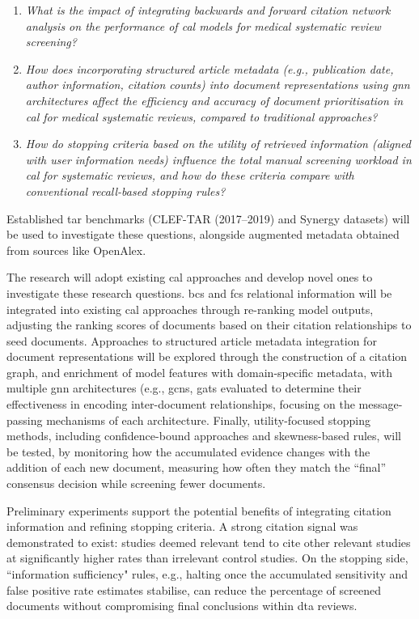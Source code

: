\documentclass[10pt,oneside]{book}
\begin{document}
\begin{enumerate}
    \item \emph{What is the impact of integrating backwards and forward citation network analysis on the performance of \gls*{cal} models for medical systematic review screening?} 
    \item \emph{How does incorporating structured article metadata (e.g., publication date, author information, citation counts) into document representations using \gls*{gnn} architectures affect the efficiency and accuracy of document prioritisation in \gls*{cal} for medical systematic reviews, compared to traditional approaches?} 
    \item \emph{How do stopping criteria based on the utility of retrieved information (aligned with user information needs) influence the total manual screening workload in \gls*{cal} for systematic reviews, and how do these criteria compare with conventional recall-based stopping rules?}
\end{enumerate}
Established \gls*{tar} benchmarks (CLEF-TAR (2017–2019) and Synergy datasets) will be used to investigate these questions, alongside augmented metadata obtained from sources like OpenAlex.


The research will adopt existing \gls*{cal} approaches and develop novel ones to investigate these research questions. \gls*{bcs} and \gls*{fcs} relational information will be integrated into existing \gls*{cal} approaches through re-ranking model outputs, adjusting the ranking scores of documents based on their citation relationships to seed documents. Approaches to structured article metadata integration for document representations will be explored through the construction of a citation graph, and enrichment of model features with domain-specific metadata, with multiple \gls*{gnn} architectures (e.g., \glspl*{gcn}, \glspl*{gat}  evaluated to determine their effectiveness in encoding inter-document relationships, focusing on the message-passing mechanisms of each architecture. Finally, utility-focused stopping methods, including confidence-bound approaches and skewness-based rules, will be tested, by monitoring how the accumulated evidence changes with the addition of each new document, measuring how often they match the “final” consensus decision while screening fewer documents. 

Preliminary experiments support the potential benefits of integrating citation information and refining stopping criteria. A strong citation signal was demonstrated to exist: studies deemed relevant tend to cite other relevant studies at significantly higher rates than irrelevant control studies. On the stopping side, ``information sufficiency" rules, e.g., halting once the accumulated sensitivity and false positive rate estimates stabilise, can reduce the percentage of screened documents without compromising final conclusions within \gls*{dta} reviews.
\end{document}
